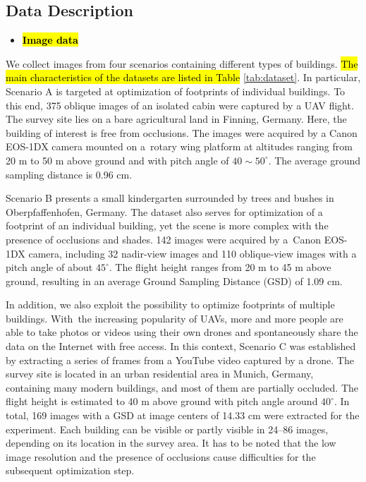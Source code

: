\subsection{Data Description}
\begin{itemize}[leftmargin=*,labelsep=5.5mm]
\item \textbf{\hl{Image data}}
\end{itemize}

We collect images from four scenarios containing different types of buildings. \hl{The main characteristics of the datasets are listed in Table }%
\ref{tab:dataset}. In particular, Scenario A is targeted at optimization of footprints of individual buildings. To this end, 375 oblique images of an isolated cabin were captured by a UAV flight. The survey site lies on a bare agricultural land in Finning, Germany. Here, the building of interest is free from occlusions. The images were acquired by a Canon EOS-1DX camera mounted on a~rotary wing platform at altitudes ranging from 20 m to 50 m above ground and with pitch angle of $40\sim50^\circ$. The average ground sampling distance is 0.96 cm.

Scenario B presents a small kindergarten surrounded by trees and bushes in Oberpfaffenhofen, Germany. The dataset also serves for optimization of a footprint of an individual building, yet the scene is more complex with the presence of occlusions and shades. 142 images were acquired by a~Canon EOS-1DX camera, including 32 nadir-view images and 110 oblique-view images with a pitch angle of about $45^\circ$. The flight height ranges from 20 m to 45 m above ground, resulting in an average Ground Sampling Distance (GSD) of 1.09 cm. 

In addition, we also exploit the possibility to optimize footprints of multiple buildings. With~the increasing popularity of UAVs, more and more people are able to take photos or videos using their own drones and spontaneously share the data on the Internet with free access. In this context, Scenario C was established by extracting a series of frames from a YouTube video captured by a drone. The survey site is located in an urban residential area in Munich, Germany, containing many modern buildings, and most of them are partially occluded. The flight height is estimated to 40 m above ground with pitch angle around $40^\circ$. In total, 169 images with a GSD at image centers of 14.33 cm were extracted for the experiment. Each building can be visible or partly visible in 24--86 images, depending on its location in the survey area. It has to be noted that the low image resolution and the presence of occlusions cause difficulties for the subsequent optimization step.

